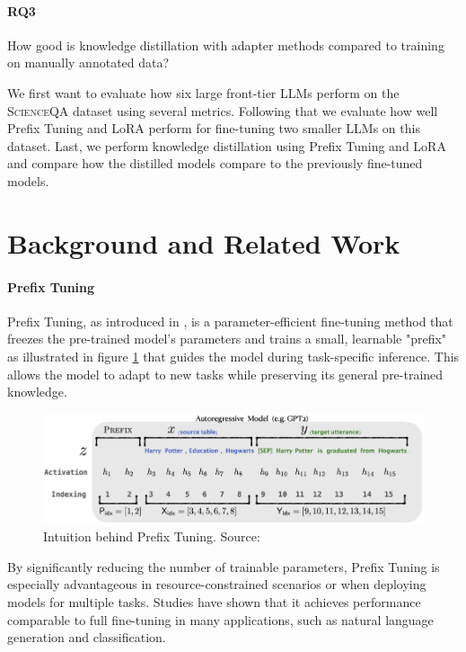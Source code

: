 \documentclass{article}
\begin{document}
\paragraph{RQ3}
\label{def:rq3}
How good is knowledge distillation with adapter methods compared to training on manually annotated data?

We first want to evaluate how six large front-tier LLMs perform on the \textsc{ScienceQA} dataset \cite{lu2022learn} using several metrics. Following that we evaluate how well Prefix Tuning \cite{li2021prefix} and LoRA \cite{hu2021lora} perform for fine-tuning two smaller LLMs on this dataset. Last, we perform knowledge distillation using Prefix Tuning and LoRA and compare how the distilled models compare to the previously fine-tuned models.

\section{Background and Related Work}
\label{related-work}

\paragraph{Prefix Tuning}
Prefix Tuning, as introduced in \cite{li2021prefix}, is a parameter-efficient fine-tuning method that freezes the pre-trained model's parameters and trains a small, learnable "prefix" as illustrated in figure \ref{fig:prefix_tuning} that guides the model during task-specific inference. This allows the model to adapt to new tasks while preserving its general pre-trained knowledge.
\begin{figure} [H]
    \centering
    \includegraphics[width=1\linewidth]{image.png}
    \caption{Intuition behind Prefix Tuning. Source: \cite{li2021prefix}}
    \label{fig:prefix_tuning}
\end{figure}
By significantly reducing the number of trainable parameters, Prefix Tuning is especially advantageous in resource-constrained scenarios or when deploying models for multiple tasks. Studies have shown that it achieves performance comparable to full fine-tuning in many applications, such as natural language generation and classification.
\end{document}
